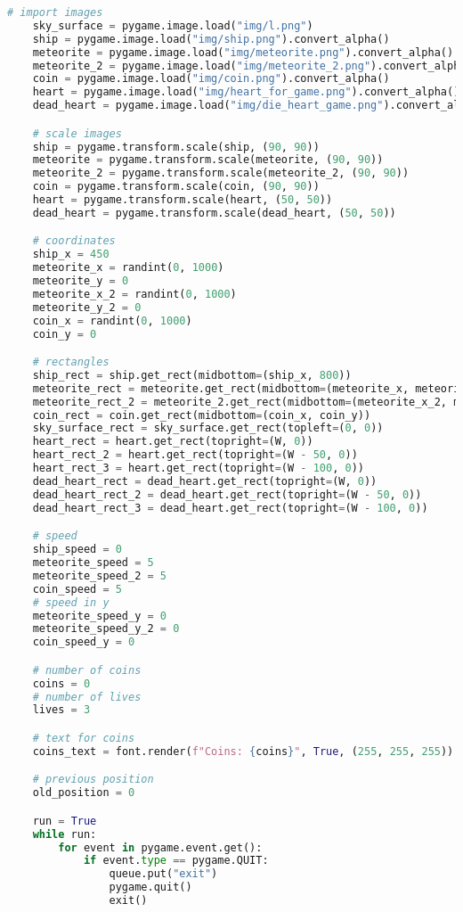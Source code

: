 \documentclass[12pt]{report}			%
\begin{document}
\begin{appendices}
\begin{lstlisting}[title={Program hra.py}, caption={hra.py},  label={lst:hra}, language=Python]
    # import images
    sky_surface = pygame.image.load("img/l.png")
    ship = pygame.image.load("img/ship.png").convert_alpha()
    meteorite = pygame.image.load("img/meteorite.png").convert_alpha()
    meteorite_2 = pygame.image.load("img/meteorite_2.png").convert_alpha()
    coin = pygame.image.load("img/coin.png").convert_alpha()
    heart = pygame.image.load("img/heart_for_game.png").convert_alpha()
    dead_heart = pygame.image.load("img/die_heart_game.png").convert_alpha()

    # scale images
    ship = pygame.transform.scale(ship, (90, 90))
    meteorite = pygame.transform.scale(meteorite, (90, 90))
    meteorite_2 = pygame.transform.scale(meteorite_2, (90, 90))
    coin = pygame.transform.scale(coin, (90, 90))
    heart = pygame.transform.scale(heart, (50, 50))
    dead_heart = pygame.transform.scale(dead_heart, (50, 50))

    # coordinates
    ship_x = 450
    meteorite_x = randint(0, 1000)
    meteorite_y = 0
    meteorite_x_2 = randint(0, 1000)
    meteorite_y_2 = 0
    coin_x = randint(0, 1000)
    coin_y = 0

    # rectangles
    ship_rect = ship.get_rect(midbottom=(ship_x, 800))
    meteorite_rect = meteorite.get_rect(midbottom=(meteorite_x, meteorite_y))
    meteorite_rect_2 = meteorite_2.get_rect(midbottom=(meteorite_x_2, meteorite_y_2))
    coin_rect = coin.get_rect(midbottom=(coin_x, coin_y))
    sky_surface_rect = sky_surface.get_rect(topleft=(0, 0))
    heart_rect = heart.get_rect(topright=(W, 0))
    heart_rect_2 = heart.get_rect(topright=(W - 50, 0))
    heart_rect_3 = heart.get_rect(topright=(W - 100, 0))
    dead_heart_rect = dead_heart.get_rect(topright=(W, 0))
    dead_heart_rect_2 = dead_heart.get_rect(topright=(W - 50, 0))
    dead_heart_rect_3 = dead_heart.get_rect(topright=(W - 100, 0))

    # speed
    ship_speed = 0
    meteorite_speed = 5
    meteorite_speed_2 = 5
    coin_speed = 5
    # speed in y
    meteorite_speed_y = 0
    meteorite_speed_y_2 = 0
    coin_speed_y = 0

    # number of coins
    coins = 0
    # number of lives
    lives = 3

    # text for coins
    coins_text = font.render(f"Coins: {coins}", True, (255, 255, 255))

    # previous position
    old_position = 0

    run = True
    while run:
        for event in pygame.event.get():
            if event.type == pygame.QUIT:
                queue.put("exit")
                pygame.quit()
                exit()


\end{lstlisting}
\end{appendices}
\end{document}
